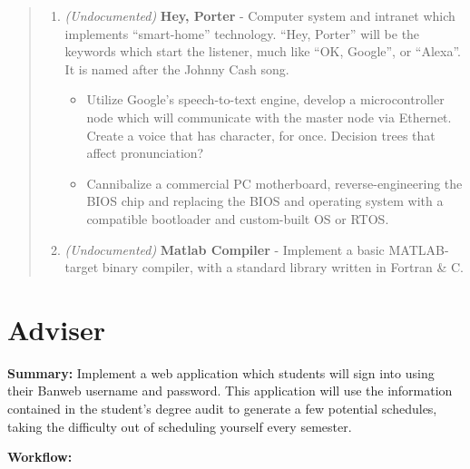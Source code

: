 \documentclass[10pt]{article}
\begin{document}
\begin{abstract}
\begin{enumerate}
    \begin{itemize}
    \item Develop an impeller pump system, which requires developing a
      homemade brushless DC motor and controller. Create a state diagram for the
      controller (Moore machine?) and design a test circuit for the controller.
      Then design and build the motor. Finally, use the motor to implement an
      impeller pump.
    \end{itemize}
  \item \emph{(Undocumented)} \textbf{Hey, Porter} - Computer system and intranet
    which implements ``smart-home'' technology. ``Hey, Porter'' will be the
    keywords which start the listener, much like ``OK, Google'', or ``Alexa''.
    It is named after the Johnny Cash song.
    \begin{itemize}
    \item Utilize Google's speech-to-text engine, develop a microcontroller
      node which will communicate with the master node via Ethernet. Create a
      voice that has character, for once. Decision trees that affect
      pronunciation?
    \item Cannibalize a commercial PC motherboard, reverse-engineering the BIOS
      chip and replacing the BIOS and operating system with a compatible
      bootloader and custom-built OS or RTOS.
    \end{itemize}
  \item \emph{(Undocumented)} \textbf{Matlab Compiler} - Implement a basic
    MATLAB-target binary compiler, with a standard library written in Fortran \&
    C.
  \end{enumerate}
\end{abstract}

\pagebreak
\section{Adviser}

\textbf{Summary:} Implement a web application which students will sign
into using their Banweb username and password. This application will use the
information contained in the student's degree audit to generate a few potential
schedules, taking the difficulty out of scheduling yourself every semester.

\textbf{Workflow:}
\begin{wrapfigure}{l}{0pt}
  \begin{tikzpicture}
  \end{tikzpicture}
\end{wrapfigure}
\end{document}
